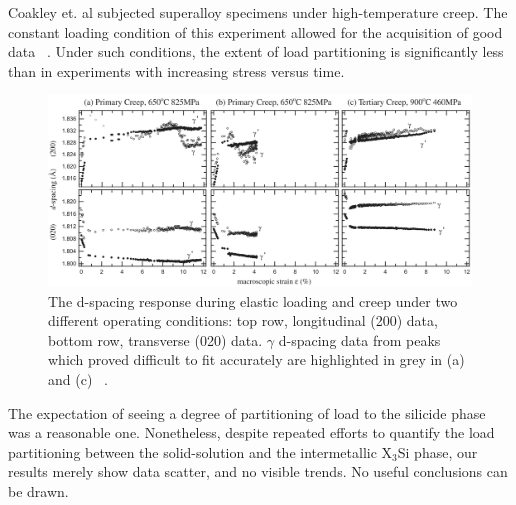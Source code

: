 Coakley et. al subjected superalloy specimens under high-temperature creep.  The constant loading condition of this experiment allowed for the acquisition of good data ~\cite{coakley12}.  Under such conditions, the extent of load partitioning is significantly less than in experiments with increasing stress versus time. 

%
\begin{figure}[H]
\begin{center}
\includegraphics[width=16.5cm]{coakley}
\vspace{-2mm}
\caption{The d-spacing response during elastic loading and creep under two different operating conditions: top row, longitudinal (200) data, bottom row, transverse (020) data. $\gamma$ d-spacing data from peaks which proved difficult to fit accurately are highlighted in grey in (a) and (c) ~\cite{coakley12}.}\label{fig:coakley}
\end{center}
\end{figure}  
%

The expectation of seeing a degree of partitioning of load to the silicide phase was a reasonable one.  Nonetheless, despite repeated efforts to quantify the load partitioning between the solid-solution and the intermetallic X$_3$Si phase, our results merely show data scatter, and no visible trends.  No useful conclusions can be drawn.

